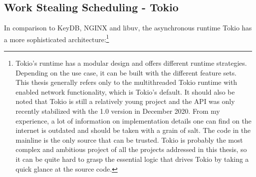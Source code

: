 \subsection{Work Stealing Scheduling - Tokio}
In comparison to KeyDB, NGINX and libuv, the asynchronous runtime Tokio has a more sophisticated architecture:\footnote{Tokio’s runtime has a modular design and offers different runtime strategies. Depending on the use case, it can be built with the different feature sets. This thesis generally refers only to the multithreaded Tokio runtime with enabled network functionality, which is Tokio’s default.  \newline
It should also be noted that Tokio is still a relatively young project and the API was only recently stabilized with the 1.0 version in December 2020. From my experience, a lot of information on implementation details one can find on the internet is outdated and should be taken with a grain of salt. The code in the mainline is the only source that can be trusted. Tokio is probably the most complex and ambitious project of all the projects addressed in this thesis, so it can be quite hard to grasp the essential logic that drives Tokio by taking a quick glance at the source code.}  \newline
